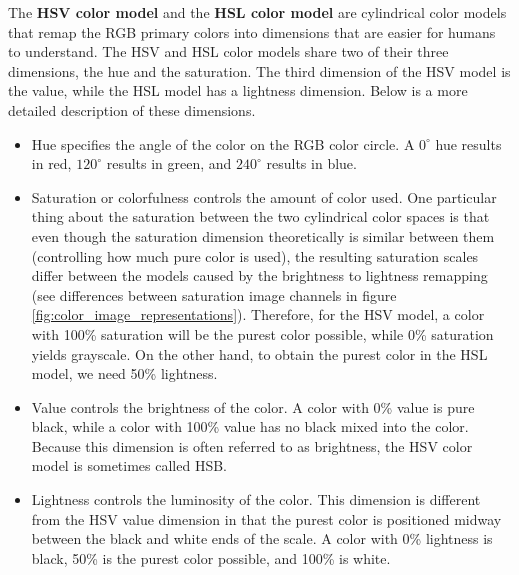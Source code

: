 The \textbf{HSV color model} and the \textbf{HSL color model} are cylindrical color models that remap the RGB primary colors into dimensions that are easier for humans to understand. The HSV and HSL color models share two of their three dimensions, the hue and the saturation. The third dimension of the HSV model is the value, while the HSL model has a lightness dimension. Below is a more detailed description of these dimensions.

\begin{itemize}
	\item Hue specifies the angle of the color on the RGB color circle. A $0^\circ$ hue results in red, $120^\circ$ results in green, and $240^\circ$ results in blue.
	\item Saturation or colorfulness controls the amount of color used. One particular thing about the saturation between the two cylindrical color spaces is that even though the saturation dimension theoretically is similar between them (controlling how much pure color is used), the resulting saturation scales differ between the models caused by the brightness to lightness remapping (see differences between saturation image channels in figure \ref{fig:color_image_representations}). Therefore, for the HSV model, a color with 100\% saturation will be the purest color possible, while 0\% saturation yields grayscale. On the other hand, to obtain the purest color in the HSL model, we need 50\% lightness.
	\item Value controls the brightness of the color. A color with 0\% value is pure black, while a color with 100\% value has no black mixed into the color. Because this dimension is often referred to as brightness, the HSV color model is sometimes called HSB.
	\item Lightness controls the luminosity of the color. This dimension is different from the HSV value dimension in that the purest color is positioned midway between the black and white ends of the scale. A color with 0\% lightness is black, 50\% is the purest color possible, and 100\% is white.
\end{itemize}

